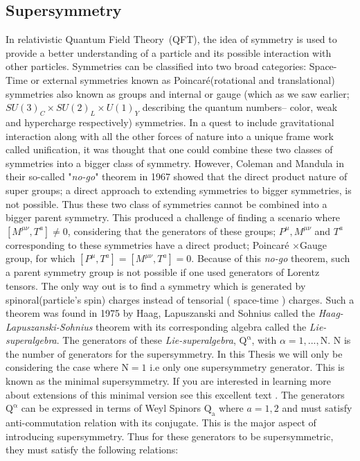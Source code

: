 \subsection{Supersymmetry}
In relativistic Quantum Field Theory~(QFT), the idea of symmetry is used to provide a better understanding of a particle and its possible interaction with other particles. Symmetries can be classified into two broad categories: Space-Time or external symmetries known as Poincar\'{e}(rotational and translational) symmetries also known as groups and internal or gauge (which as we saw earlier; $SU(3)_{C}\times SU(2)_{L}\times U(1)_{Y}$ describing the quantum numbers-- color, weak and hypercharge respectively) symmetries. In a quest to include gravitational interaction along with all the other forces of nature into a unique frame work called unification, it was thought that one could combine these two classes of symmetries into a bigger class of symmetry. However, Coleman and Mandula in their so-called "\textit{no-go}" theorem in 1967 \cite{SUSY} showed that the direct product nature of super groups; a direct approach to extending symmetries to bigger symmetries, is not possible. Thus these two class of symmetries cannot be combined into a bigger parent symmetry. This produced a challenge of finding a scenario where $ \left[M^{\mu\nu}, T^{a}\right] \neq 0$,  considering  that the generators of these groups; $P^{\mu}, M^{\mu\nu}$ and $T^{a}$ corresponding to these symmetries have a direct product;  Poincar\'{e} $\times$Gauge group, for which $ \left[P^{\mu}, T^{a}\right] = \left[M^{\mu\nu}, T^{a}\right] = 0$. 
\newline
Because of this \textit{no-go} theorem, such a parent symmetry group is not possible if one used generators of Lorentz tensors. The only way out is to find a symmetry which is generated by spinoral(particle's spin) charges instead of tensorial ( space-time ) charges. Such a theorem was found in 1975 by Haag, Lapuszanski and Sohnius \cite{MSUSY}  called the  \textit{Haag-Lapuszanski-Sohnius} theorem with its corresponding algebra called the \textit{Lie-superalgebra}. 
\newline
The generators of these \textit{Lie-superalgebra}, $\mathrm{Q^{\alpha}}$, with $\alpha = 1,...,\mathrm{N}$. $\mathrm{N}$ is the number of generators for the supersymmetry. In this Thesis we will only be considering the case where $\mathrm{N} = 1$ i.e only one supersymmetry generator. This is known as the minimal supersymmetry. If you are interested in  learning more about extensions of this minimal version see this excellent text \cite{SUSYText}. The generators $\mathrm{Q^{\alpha}}$ can be expressed in terms of Weyl Spinors $\mathrm{Q_{a}}$ where $a=1,2$ and must satisfy anti-commutation relation with its conjugate. This is the major aspect of introducing supersymmetry.
Thus for these generators to be supersymmetric, they must satisfy the following relations:

